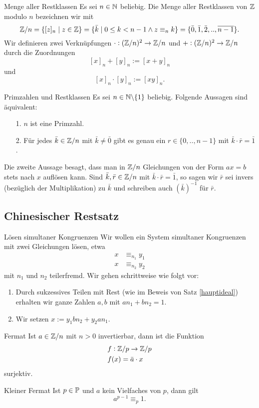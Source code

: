 \begin{definition}{Menge aller Restklassen}
 Es sei $n\in\N$ beliebig. Die Menge aller Restklassen von $\Z$ modulo $n$ bezeichnen wir mit
\[
\Z/n=\{[z]_n\mid z\in\Z\}=\{\bar k\mid 0\leq k<n-1\wedge z\modn k\}=\{\bar 0,\bar1,\bar2,..,\overline{n-1}\}.
\]
Wir definieren zwei Verknüpfungen $\cdot:(\Z/n)^2\rightarrow \Z/n$ und $+:(\Z/n)^2\rightarrow \Z/n$ durch die Zuordnungen
\[
 [x]_n+[y]_n:=[x+y]_n
\]
und
\[
 [x]_n\cdot[y]_n:=[xy]_n.
\]
\end{definition}

\begin{theorem}{Primzahlen und Restklassen}
Es sei $n\in\N\backslash\{1\}$ beliebig. Folgende Aussagen sind äquivalent:
\begin{enumerate}
\item[1.] $n$ ist eine Primzahl.
\item[2.] Für jedes $\bar k\in\Z/n$ mit $\bar k\neq\bar 0$ gibt es genau ein $r\in\{0,..,n-1\}$ mit $\bar k\cdot\bar r=\bar 1$.
\end{enumerate}
Die zweite Aussage besagt, dass man in $\Z/n$ Gleichungen von der Form $ax=b$ stets nach $x$ auflösen kann. Sind $\bar k,\bar r\in\Z/n$ mit $\bar k\cdot\bar r=\bar 1$, so sagen wir $\bar r$ sei invers (bezüglich der Multiplikation) zu $\bar k$ und schreiben auch $(\bar{k})^{-1}$ für $\bar r$.
\end{theorem}

\subsection{Chinesischer Restsatz}

\begin{howto}{Lösen simultaner Kongruenzen}
Wir wollen ein System simultaner Kongruenzen mit zwei Gleichungen lösen, etwa
\begin{align*}
x&\equiv_{n_1} y_1\\
x&\equiv_{n_2} y_2
\end{align*}
mit $n_1$ und $n_2$ teilerfremd. Wir gehen schrittweise wie folgt vor:
 \begin{enumerate}
  \item Durch sukzessives Teilen mit Rest (wie im Beweis von Satz \ref{hauptideal}) erhalten wir ganze Zahlen $a,b$ mit $an_1+bn_2=1$.
\item Wir setzen $x:=y_1bn_2+y_2an_1$.
 \end{enumerate}
\end{howto}

\begin{lemma}{Fermat}
Ist $a\in\Z/n$ mit $n>0$ invertierbar, dann ist die Funktion
\begin{align*}
f&:\Z/p\to\Z/p\\
f&(x)=\bar a\cdot x
\end{align*}
surjektiv.
\end{lemma}

\begin{lemma}{Kleiner Fermat}
Ist $p\in\P$ und $a$ kein Vielfaches von $p$, dann gilt
\[
a^{p-1}\equiv_p1.
\]
\end{lemma}